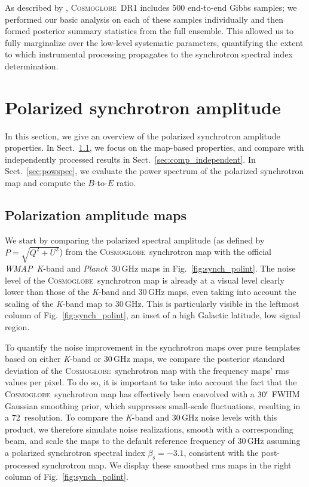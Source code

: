\documentclass[twocolumn]{../../common/aa}
\def\WMAP{\emph{WMAP}}
\def\Planck{\emph{Planck}}
\newcommand{\cosmoglobe}{\textsc{Cosmoglobe}}
\newcommand{\K}[0]{\textit K}
\begin{document}
As described by \citet{watts2023_dr1}, \cosmoglobe\ DR1 includes 500 end-to-end Gibbs samples; we performed our basic analysis on each of these samples individually and then formed posterior summary statistics from the full ensemble. This allowed us to fully marginalize over the low-level systematic parameters, quantifying the extent to which instrumental processing propagates to the synchrotron spectral index determination.


\section{Polarized synchrotron amplitude}
\label{sec:pol_amp}

In this section, we give an overview of the polarized synchrotron amplitude properties. In Sect.~\ref{sec:pol_amp_map}, we focus on the map-based properties, and compare with independently processed results in Sect.~\ref{sec:comp_independent}. In Sect.~\ref{sec:powspec},  we evaluate the power spectrum of the polarized synchrotron map and compute the $B$-to-$E$ ratio.

\subsection{Polarization amplitude maps}
\label{sec:pol_amp_map}



We start by comparing the polarized spectral amplitude (as defined by $P=\sqrt{Q^2+U^2}$) from the \cosmoglobe\ synchrotron map with the official \WMAP\ \K-band and \Planck\ 30\,GHz maps in Fig.~\ref{fig:synch_polint}. The noise level of the \cosmoglobe\ synchrotron map is already at a visual level clearly lower than those of the \K-band and 30\,GHz maps, even taking into account the scaling of the \K-band map to 30\,GHz.  This is particularly visible in the leftmost column of Fig.~\ref{fig:synch_polint}, an inset of a high Galactic latitude, low signal region.

To quantify the noise improvement in the synchrotron maps over pure templates based on either \K-band or 30\,GHz maps, we compare the posterior standard deviation of the \cosmoglobe\ synchrotron map with the frequency maps' rms values per pixel.
To do so, it is important to take into account the fact that the \cosmoglobe\ synchrotron map has effectively been convolved with a $30\arcm$ FWHM Gaussian smoothing prior, which suppresses small-scale fluctuations, resulting in a 72\arcmin\ resolution. To compare the \K-band and 30\,GHz noise levels with this product, we therefore simulate noise realizations, smooth with a corresponding beam, and scale the maps to the default reference frequency of 30\,GHz assuming a polarized synchrotron spectral index $\beta_\mathrm s=-3.1$, consistent with the post-processed synchrotron map. We display these smoothed rms maps in the right column of Fig.~\ref{fig:synch_polint}.
\end{document}
